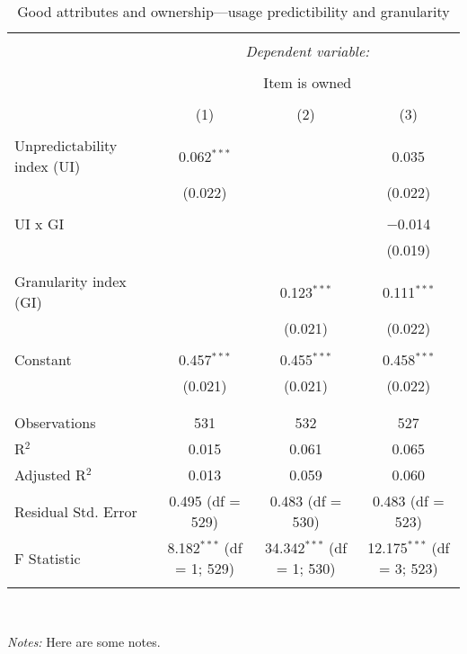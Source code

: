 
\begin{table}[!htbp] \centering 
  \caption{Good attributes and ownership---usage predictibility and granularity} 
  \label{tab:ownership_attr} 
\begin{tabular}{@{\extracolsep{5pt}}lccc} 
\\[-1.8ex]\hline 
\hline \\[-1.8ex] 
 & \multicolumn{3}{c}{\textit{Dependent variable:}} \\ 
\cline{2-4} 
\\[-1.8ex] & \multicolumn{3}{c}{Item is owned} \\ 
\\[-1.8ex] & (1) & (2) & (3)\\ 
\hline \\[-1.8ex] 
 Unpredictability index (UI) & 0.062$^{***}$ &  & 0.035 \\ 
  & (0.022) &  & (0.022) \\ 
  & & & \\ 
 UI x GI &  &  & $-$0.014 \\ 
  &  &  & (0.019) \\ 
  & & & \\ 
 Granularity index (GI) &  & 0.123$^{***}$ & 0.111$^{***}$ \\ 
  &  & (0.021) & (0.022) \\ 
  & & & \\ 
 Constant & 0.457$^{***}$ & 0.455$^{***}$ & 0.458$^{***}$ \\ 
  & (0.021) & (0.021) & (0.022) \\ 
  & & & \\ 
\hline \\[-1.8ex] 
Observations & 531 & 532 & 527 \\ 
R$^{2}$ & 0.015 & 0.061 & 0.065 \\ 
Adjusted R$^{2}$ & 0.013 & 0.059 & 0.060 \\ 
Residual Std. Error & 0.495 (df = 529) & 0.483 (df = 530) & 0.483 (df = 523) \\ 
F Statistic & 8.182$^{***}$ (df = 1; 529) & 34.342$^{***}$ (df = 1; 530) & 12.175$^{***}$ (df = 3; 523) \\ 
\hline 
\hline \\[-1.8ex] 
\end{tabular}
\\
{\footnotesize 
\begin{minipage}{0.90 \linewidth}
 \emph{Notes:} Here are some notes.
\end{minipage}
}
\end{table}

